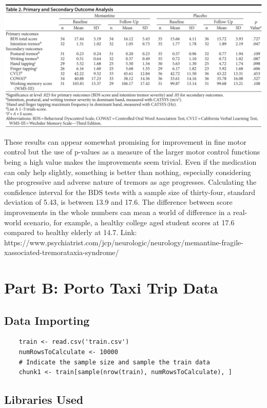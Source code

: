 \documentclass{article}
\numberwithin{equation}{section}
\begin{document}
\includegraphics[scale=0.3]{RayTable.png}

These results can appear somewhat promising for improvement in fine motor control but the use of p-values as a measure of the larger motor control functions being a high value makes the improvements seem trivial. Even if the medication can only help slightly, something is better than nothing, especially considering the progressive and adverse nature of tremors as age progresses. Calculating the confidence interval for the BDS tests with a sample size of thirty-four, standard deviation of 5.43, is between 13.9 and 17.6. The difference between score improvements in the whole numbers can mean a world of difference in a real-world scenario, for example, a healthy college aged student scores at 17.6 compared to healthy elderly at 14.7.
Link: https://www.psychiatrist.com/jcp/neurologic/neurology/memantine-fragile-xassociated-tremorataxia-syndrome/

\newpage

\section{Part B: Porto Taxi Trip Data}

\subsection{Data Importing}

\begin{lstlisting}
    train <- read.csv('train.csv')
    numRowsToCalculate <- 10000 
    # Indicate the sample size and sample the train data
    chunk1 <- train[sample(nrow(train), numRowsToCalculate), ]
\end{lstlisting}

\subsection{Libraries Used}
\end{document}
